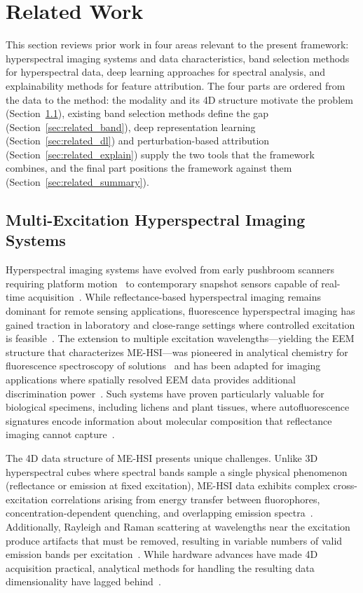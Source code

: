 \section{Related Work}
\label{sec:related_work}

This section reviews prior work in four areas relevant to the present framework: hyperspectral imaging systems and data characteristics, band selection methods for hyperspectral data, deep learning approaches for spectral analysis, and explainability methods for feature attribution.
The four parts are ordered from the data to the method: the modality and its 4D structure motivate the problem (Section~\ref{sec:related_hsi}), existing band selection methods define the gap (Section~\ref{sec:related_band}), deep representation learning (Section~\ref{sec:related_dl}) and perturbation-based attribution (Section~\ref{sec:related_explain}) supply the two tools that the framework combines, and the final part positions the framework against them (Section~\ref{sec:related_summary}).

\subsection{Multi-Excitation Hyperspectral Imaging Systems}
\label{sec:related_hsi}

Hyperspectral imaging systems have evolved from early pushbroom scanners requiring platform motion~\cite{goetz1985imaging} to contemporary snapshot sensors capable of real-time acquisition~\cite{hagen2013review}.
While reflectance-based hyperspectral imaging remains dominant for remote sensing applications, fluorescence hyperspectral imaging has gained traction in laboratory and close-range settings where controlled excitation is feasible~\cite{mishra2017close}.
The extension to multiple excitation wavelengths---yielding the EEM structure that characterizes ME-HSI---was pioneered in analytical chemistry for fluorescence spectroscopy of solutions~\cite{murphy2013fluorescence} and has been adapted for imaging applications where spatially resolved EEM data provides additional discrimination power~\cite{lavine2001exploratory}.
Such systems have proven particularly valuable for biological specimens, including lichens and plant tissues, where autofluorescence signatures encode information about molecular composition that reflectance imaging cannot capture~\cite{croce2019autofluorescence}.

The 4D data structure of ME-HSI presents unique challenges.
Unlike 3D hyperspectral cubes where spectral bands sample a single physical phenomenon (reflectance or emission at fixed excitation), ME-HSI data exhibits complex cross-excitation correlations arising from energy transfer between fluorophores, concentration-dependent quenching, and overlapping emission spectra~\cite{lakowicz2006principles}.
Additionally, Rayleigh and Raman scattering at wavelengths near the excitation produce artifacts that must be removed, resulting in variable numbers of valid emission bands per excitation~\cite{murphy2013fluorescence}.
While hardware advances have made 4D acquisition practical, analytical methods for handling the resulting data dimensionality have lagged behind~\cite{mishra2017close}.

